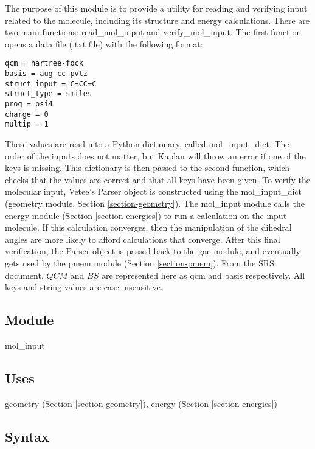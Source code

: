 \documentclass[12pt, titlepage]{article}
\newcommand{\progname}{Kaplan}
\begin{document}


The purpose of this module is to provide a utility for reading and verifying 
input related to the molecule, including its structure and energy calculations. 
There are two main functions: read\_mol\_input and verify\_mol\_input. The 
first function opens a data file (.txt file) with the following format:

\begin{lstlisting}
qcm = hartree-fock
basis = aug-cc-pvtz
struct_input = C=CC=C
struct_type = smiles
prog = psi4
charge = 0
multip = 1
\end{lstlisting}

These values are read into a Python dictionary, called mol\_input\_dict. The 
order of the inputs does not matter, but \progname{} will throw an error if one 
of the keys is missing. This dictionary is then passed to the second function, 
which checks that the values are correct and that all keys have been given. To 
verify the molecular input, Vetee's Parser object is constructed using the 
mol\_input\_dict (geometry module, Section \ref{section-geometry}). The 
mol\_input module calls the energy module (Section \ref{section-energies}) to 
run a calculation on the input molecule. If this calculation converges, then 
the manipulation of the dihedral angles are more likely to afford calculations 
that converge. After this final verification, the Parser object is passed back 
to the gac module, and eventually gets used by the pmem module 
(Section \ref{section-pmem}). From the SRS document, $QCM$ and $BS$ are 
represented here as qcm and basis respectively. All keys and string values are 
case insensitive.

\subsection{Module}

mol\_input

\subsection{Uses}

geometry (Section \ref{section-geometry}), energy (Section 
\ref{section-energies})

\subsection{Syntax}
\end{document}
